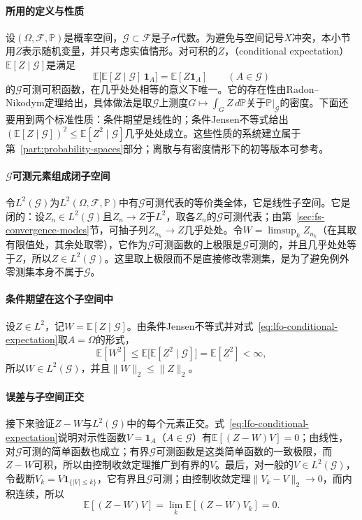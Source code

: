 \paragraph{所用的定义与性质}
设$(\Omega,\mathcal F,\mathbb P)$是概率空间，$\mathcal G\subset\mathcal F$是子$\sigma$代数。为避免与空间记号$X$冲突，本小节用$Z$表示随机变量，并只考虑实值情形。对可积的$Z$，（conditional expectation）$\mathbb E[Z\mid\mathcal G]$是满足
\begin{equation}
 \mathbb E\bigl[\mathbb E[Z\mid\mathcal G]\,\mathbf 1_A\bigr]=\mathbb E[Z\mathbf 1_A]\qquad(A\in\mathcal G)
 \label{eq:lfo-conditional-expectation}
\end{equation}
的$\mathcal G$可测可积函数，在几乎处处相等的意义下唯一。它的存在性由Radon--Nikodym定理给出，具体做法是取$\mathcal G$上测度$G\mapsto\int_G Z\,d\mathbb P$关于$\mathbb P|_{\mathcal G}$的密度。下面还要用到两个标准性质：条件期望是线性的；条件Jensen不等式给出$(\mathbb E[Z\mid\mathcal G])^2\leq\mathbb E[Z^2\mid\mathcal G]$几乎处处成立。这些性质的系统建立属于第~\ref{part:probability-spaces}部分；离散与有密度情形下的初等版本可参考。

\paragraph{$\mathcal G$可测元素组成闭子空间}
令$L^2(\mathcal G)$为$L^2(\Omega,\mathcal F,\mathbb P)$中有$\mathcal G$可测代表的等价类全体，它是线性子空间。它是闭的：设$Z_n\in L^2(\mathcal G)$且$Z_n\to Z$于$L^2$，取各$Z_n$的$\mathcal G$可测代表；由第~\ref{sec:fs-convergence-modes}节，可抽子列$Z_{n_k}\to Z$几乎处处。令$W=\limsup_kZ_{n_k}$（在其取有限值处，其余处取零），它作为$\mathcal G$可测函数的上极限是$\mathcal G$可测的，并且几乎处处等于$Z$，所以$Z\in L^2(\mathcal G)$。这里取上极限而不是直接修改零测集，是为了避免例外零测集本身不属于$\mathcal G$。

\paragraph{条件期望在这个子空间中}
设$Z\in L^2$，记$W=\mathbb E[Z\mid\mathcal G]$。由条件Jensen不等式并对式~\eqref{eq:lfo-conditional-expectation}取$A=\Omega$的形式，
\[
 \mathbb E[W^2]\leq\mathbb E\bigl[\mathbb E[Z^2\mid\mathcal G]\bigr]=\mathbb E[Z^2]<\infty ,
\]
所以$W\in L^2(\mathcal G)$，并且$\|W\|_2\leq\|Z\|_2$。

\paragraph{误差与子空间正交}
接下来验证$Z-W$与$L^2(\mathcal G)$中的每个元素正交。式~\eqref{eq:lfo-conditional-expectation}说明对示性函数$V=\mathbf 1_A$（$A\in\mathcal G$）有$\mathbb E[(Z-W)V]=0$；由线性，对$\mathcal G$可测的简单函数也成立；有界$\mathcal G$可测函数是这类简单函数的一致极限，而$Z-W$可积，所以由控制收敛定理推广到有界的$V$。最后，对一般的$V\in L^2(\mathcal G)$，令截断$V_k=V\mathbf 1_{\{|V|\leq k\}}$，它有界且$\mathcal G$可测；由控制收敛定理$\|V_k-V\|_2\to0$，而内积连续，所以
\[
 \mathbb E[(Z-W)V]=\lim_k\mathbb E[(Z-W)V_k]=0 .
\]

